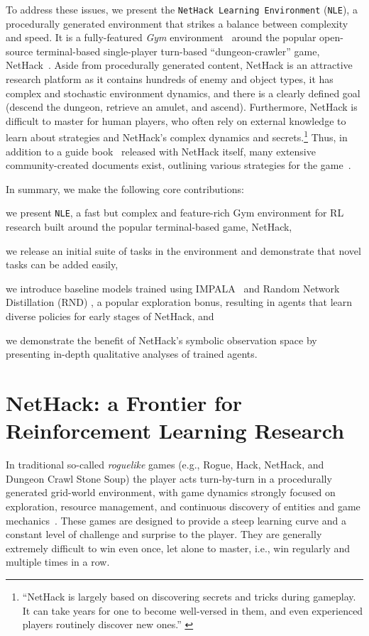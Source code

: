 \documentclass{article}
\newcommand{\nethack}{NetHack}
\newcommand{\hack}{Hack}
\newcommand{\rogue}{Rogue}
\newcommand{\dcss}{Dungeon Crawl Stone Soup}
\newcommand{\nethackenv}{\texttt{NetHack Learning Environment}}
\newcommand{\NLE}{\texttt{NLE}}
\begin{document}
To address these issues, we present the \nethackenv{} (\NLE{}), a procedurally generated environment that strikes a balance between complexity and speed. It is a fully-featured
\emph{Gym} environment~\citep{DBLP:journals/corr/BrockmanCPSSTZ16} around the popular open-source terminal-based
single-player turn-based ``dungeon-crawler''
game, \nethack{}~\citep{NetHackOrg}.  Aside from procedurally generated content, \nethack{} is an
attractive research platform as it contains hundreds of enemy and
object types, it has complex and stochastic environment dynamics, and
there is a clearly defined goal (descend the dungeon, retrieve an
amulet, and ascend).  Furthermore, \nethack{} is difficult to master
for human players, who often rely on external knowledge to learn about strategies and NetHack's complex
dynamics and secrets.\footnote{``NetHack is largely based on discovering secrets
  and tricks during gameplay. It can take years for one to become
  well-versed in them, and even experienced players routinely discover
  new ones.'' \citep{elitmod}} Thus, in addition to a guide
book~\cite{raymond1987guide, raymond2020guide} released with \nethack{} itself, many extensive community-created documents exist, outlining various strategies for the game~\citep[e.g.,][]{nhwiki,NetHackSpoilers}.

In summary, we make the following core contributions:
\begin{enumerate*}[label=(\roman*)]
\item we present \NLE{}, a fast but complex and feature-rich Gym
  environment for RL research built around the popular terminal-based
  game, \nethack{},
\item we release an initial suite of tasks in the environment
  and demonstrate that novel tasks can be added easily,
\item we introduce baseline models trained using IMPALA~\citep{DBLP:conf/icml/EspeholtSMSMWDF18} and Random Network Distillation (RND) \citep{DBLP:conf/iclr/BurdaESK19}, a popular exploration bonus, resulting in agents that learn diverse policies for early stages of \nethack{}, and
\item we demonstrate the benefit of \nethack{}'s symbolic observation space by presenting in-depth qualitative analyses of
  trained agents.
\end{enumerate*}

\section{NetHack: a Frontier for Reinforcement Learning Research}
In traditional so-called \emph{roguelike} games (e.g., \rogue{}, \hack{}, \nethack{},
and \dcss{}) the player acts turn-by-turn in a procedurally generated
grid-world environment, with game dynamics strongly focused on
exploration, resource management, and continuous discovery of entities
and game mechanics~.
These games are designed to provide a steep learning curve and a
constant level of challenge and surprise to the player.  They are
generally extremely difficult to win even once, let alone to master, i.e., win regularly and multiple times in a row.
\end{document}
